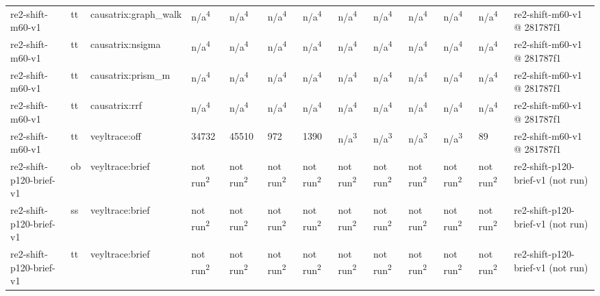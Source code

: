 \begin{table}[t]
\begin{tabular}{lllllllllllll}
re2-shift-m60-v1 & tt & causatrix:graph\_walk & n/a\textsuperscript{4} & n/a\textsuperscript{4} & n/a\textsuperscript{4} & n/a\textsuperscript{4} & n/a\textsuperscript{4} & n/a\textsuperscript{4} & n/a\textsuperscript{4} & n/a\textsuperscript{4} & n/a\textsuperscript{4} & re2-shift-m60-v1 @ 281787f1 \\
re2-shift-m60-v1 & tt & causatrix:nsigma & n/a\textsuperscript{4} & n/a\textsuperscript{4} & n/a\textsuperscript{4} & n/a\textsuperscript{4} & n/a\textsuperscript{4} & n/a\textsuperscript{4} & n/a\textsuperscript{4} & n/a\textsuperscript{4} & n/a\textsuperscript{4} & re2-shift-m60-v1 @ 281787f1 \\
re2-shift-m60-v1 & tt & causatrix:prism\_m & n/a\textsuperscript{4} & n/a\textsuperscript{4} & n/a\textsuperscript{4} & n/a\textsuperscript{4} & n/a\textsuperscript{4} & n/a\textsuperscript{4} & n/a\textsuperscript{4} & n/a\textsuperscript{4} & n/a\textsuperscript{4} & re2-shift-m60-v1 @ 281787f1 \\
re2-shift-m60-v1 & tt & causatrix:rrf & n/a\textsuperscript{4} & n/a\textsuperscript{4} & n/a\textsuperscript{4} & n/a\textsuperscript{4} & n/a\textsuperscript{4} & n/a\textsuperscript{4} & n/a\textsuperscript{4} & n/a\textsuperscript{4} & n/a\textsuperscript{4} & re2-shift-m60-v1 @ 281787f1 \\
re2-shift-m60-v1 & tt & veyltrace:off & 34732 & 45510 & 972 & 1390 & n/a\textsuperscript{3} & n/a\textsuperscript{3} & n/a\textsuperscript{3} & n/a\textsuperscript{3} & 89 & re2-shift-m60-v1 @ 281787f1 \\
re2-shift-p120-brief-v1 & ob & veyltrace:brief & not run\textsuperscript{2} & not run\textsuperscript{2} & not run\textsuperscript{2} & not run\textsuperscript{2} & not run\textsuperscript{2} & not run\textsuperscript{2} & not run\textsuperscript{2} & not run\textsuperscript{2} & not run\textsuperscript{2} & re2-shift-p120-brief-v1 (not run) \\
re2-shift-p120-brief-v1 & ss & veyltrace:brief & not run\textsuperscript{2} & not run\textsuperscript{2} & not run\textsuperscript{2} & not run\textsuperscript{2} & not run\textsuperscript{2} & not run\textsuperscript{2} & not run\textsuperscript{2} & not run\textsuperscript{2} & not run\textsuperscript{2} & re2-shift-p120-brief-v1 (not run) \\
re2-shift-p120-brief-v1 & tt & veyltrace:brief & not run\textsuperscript{2} & not run\textsuperscript{2} & not run\textsuperscript{2} & not run\textsuperscript{2} & not run\textsuperscript{2} & not run\textsuperscript{2} & not run\textsuperscript{2} & not run\textsuperscript{2} & not run\textsuperscript{2} & re2-shift-p120-brief-v1 (not run) \\

\end{tabular}
\end{table}
